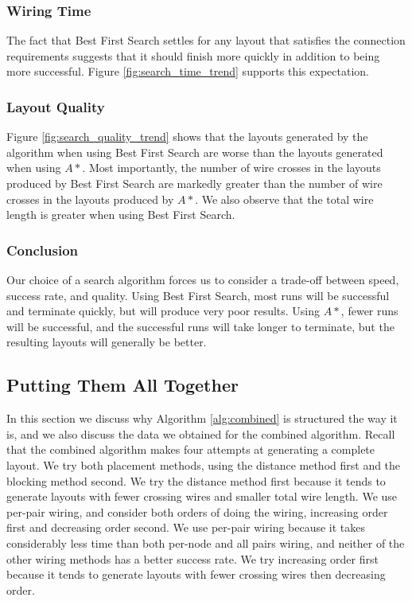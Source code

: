 \subsubsection{Wiring Time}
The fact that Best First Search settles for any layout that satisfies the
connection
requirements suggests that it should finish more quickly in addition to being
more successful. Figure \ref{fig:search_time_trend} supports this
expectation.

\subsubsection{Layout Quality}
Figure \ref{fig:search_quality_trend} shows that the layouts generated by the
algorithm when using Best First Search are worse than the layouts generated
when using $A*$. Most importantly, the
number of wire crosses in the layouts produced by Best First Search are markedly
greater than the number of wire crosses in the layouts produced by $A*$. We also
observe that the total wire length is greater when using Best First Search.

\subsubsection{Conclusion}
Our choice of a search algorithm forces us to consider a trade-off between
speed, success rate, and quality.
Using Best First Search, most runs will be successful
and terminate quickly, but will produce very poor results. Using $A*$,
fewer runs will be successful, and the successful runs will take longer to
terminate, but the resulting layouts will generally be better.

\subsection{Putting Them All Together}
\label{sec:method_combination}

In this section we discuss why Algorithm
\ref{alg:combined} is structured the way it is, and we also
discuss the data we obtained for the combined algorithm. Recall that the combined
algorithm makes four attempts at generating a complete layout. We try both
placement methods, using the distance method first and the blocking method
second. We
try the distance method first because it tends to generate layouts with fewer
crossing wires and smaller total wire length. We use per-pair wiring, and
consider both orders of doing the wiring, increasing order first and decreasing
order second. We use per-pair wiring because it takes considerably
less time than both per-node and all pairs wiring, and neither of the other
wiring methods has a better success rate. We try increasing order first because
it tends to generate layouts with fewer crossing wires then decreasing order.

